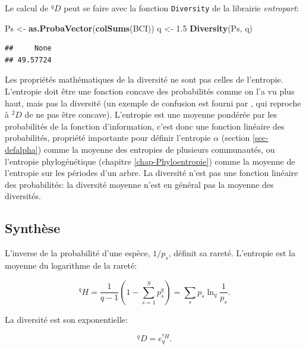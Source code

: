 \documentclass[
  11pt,
  french,
  a4paper,
  extrafontsizes,onecolumn,openright
  ]{memoir}
\newenvironment{Shaded}{\begin{snugshade}}{\end{snugshade}}
\newcommand{\FloatTok}[1]{\textcolor[rgb]{0.00,0.00,0.81}{#1}}
\newcommand{\FunctionTok}[1]{\textcolor[rgb]{0.13,0.29,0.53}{\textbf{#1}}}
\newcommand{\NormalTok}[1]{#1}
\newcommand{\OtherTok}[1]{\textcolor[rgb]{0.56,0.35,0.01}{#1}}
\begin{document}
Le calcul de \(^{q}\!D\) peut se faire avec la fonction \texttt{Diversity} de la librairie \emph{entropart}:

\scriptsize

\begin{Shaded}
\begin{Highlighting}[]
\NormalTok{Ps }\OtherTok{\textless{}{-}} \FunctionTok{as.ProbaVector}\NormalTok{(}\FunctionTok{colSums}\NormalTok{(BCI))}
\NormalTok{q }\OtherTok{\textless{}{-}} \FloatTok{1.5}
\FunctionTok{Diversity}\NormalTok{(Ps, q)}
\end{Highlighting}
\end{Shaded}

\begin{verbatim}
##     None 
## 49.57724
\end{verbatim}

\normalsize

Les propriétés mathématiques de la diversité ne sont pas celles de l'entropie.
L'entropie doit être une fonction concave des probabilités comme on l'a vu plus haut, mais pas la diversité (un exemple de confusion est fourni par \textcite{Gadagkar1989}, qui reproche à \(^{2}\!D\) de ne pas être concave).
L'entropie est une moyenne pondérée par les probabilités de la fonction d'information, c'est donc une fonction linéaire des probabilités, propriété importante pour définir l'entropie \(\alpha\) (section \ref{sec-defalpha}) comme la moyenne des entropies de plusieurs communautés, ou l'entropie phylogénétique (chapitre \ref{chap-Phyloentropie}) comme la moyenne de l'entropie sur les périodes d'un arbre.
La diversité n'est pas une fonction linéaire des probabilités: la diversité moyenne n'est en général pas la moyenne des diversités.

\subsection{Synthèse}\label{synthuxe8se-1}

L'inverse de la probabilité d'une espèce, \(1/p_s\), définit sa rareté.
L'entropie est la moyenne du logarithme de la rareté:

\begin{equation}
  \label{eq:EntropieRarete}
  ^{q}\!H = \frac{1}{q-1}\left(1-\sum^S_{s=1}{p^q_s}\right)=\sum_s{p_s}\ln_q\frac{1}{p_s}.
\end{equation}

La diversité est son exponentielle:

\begin{equation}
  \label{eq:DexpHSynthese}
  ^{q}\!D = e_q^{^{q}\!H}.
\end{equation}
\end{document}

